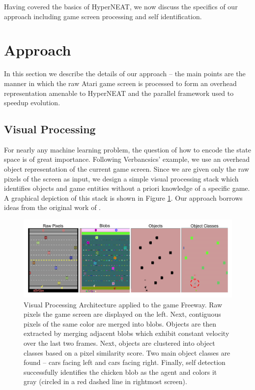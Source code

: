 \documentclass{acm_proc_article-sp}
\begin{document}
Having covered the basics of HyperNEAT, we now discuss the specifics of our approach including game screen processing and self identification.

\section{Approach}
\label{sec:approach}
In this section we describe the details of our approach -- the main points are the manner in which the raw Atari game screen is processed to form an overhead representation amenable to HyperNEAT and the parallel framework used to speedup evolution.

\subsection{Visual Processing}
For nearly any machine learning problem, the question of how to encode the state space is of great importance. Following Verbancsics' example, we use an overhead object representation of the current game screen. Since we are given only the raw pixels of the screen as input, we design a simple visual processing stack which identifies objects and game entities without a priori knowledge of a specific game. A graphical depiction of this stack is shown in Figure \ref{fig:visproc}. Our approach borrows ideas from the original work of \cite{naddaf10}. 

\begin{figure}[htp]
\begin{center}
\includegraphics[width=\textwidth]{figures/AtariArch}
\end{center}
\caption{Visual Processing Architecture applied to the game Freeway. Raw pixels the game screen are displayed on the left. Next, contiguous pixels of the same color are merged into blobs. Objects are then extracted by merging adjacent blobs which exhibit constant velocity over the last two frames. Next, objects are clustered into object classes based on a pixel similarity score. Two main object classes are found -- cars facing left and cars facing right. Finally, self detection successfully identifies the chicken blob as the agent and colors it gray (circled in a red dashed line in rightmost screen).}
\label{fig:visproc}
\end{figure}
\end{document}
